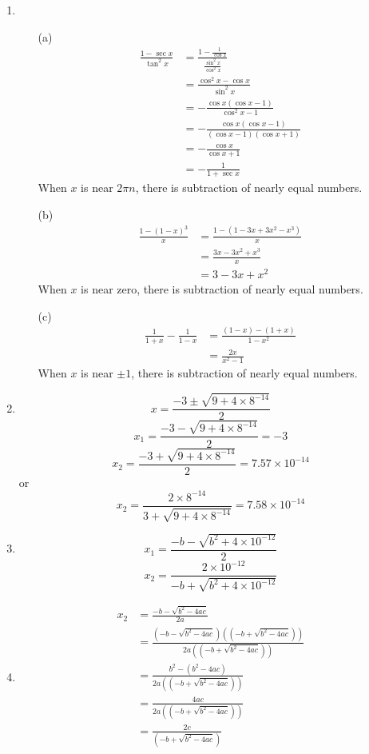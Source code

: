 \documentclass[UTF8]{ctexart}
\begin{document}
\begin{enumerate}
\item \begin{itemize}
\item[(a)] 
\begin{align*}
\frac{1 - \sec x}{\tan^2x} &= \frac{1 - \frac{1}{\cos x}}{\frac{\sin^2 x}{\cos^2 x}} \\
&= \frac{\cos^2 x - \cos x}{\sin^2 x} \\
&= -\frac{\cos x(\cos x - 1)}{\cos^2 x - 1} \\
&= -\frac{\cos x(\cos x - 1)}{(\cos x - 1)(\cos x + 1)} \\
&= -\frac{\cos x}{\cos x + 1} \\
&= -\frac{1}{1 + \sec x}
\end{align*}
When $x$ is near $2\pi n$, there is subtraction of nearly equal numbers.

\item[(b)] 
\begin{align*}
\frac{1 - (1-x)^3}{x} &= \frac{1 - (1 - 3x + 3x^2 - x^3)}{x} \\
&= \frac{3x - 3x^2 + x^3}{x} \\
&= 3 - 3x + x^2
\end{align*}
When $x$ is near zero, there is subtraction of nearly equal numbers.

\item[(c)]
\begin{align*}
\frac{1}{1 + x} - \frac{1}{1 - x} &= \frac{(1 - x) - (1 + x)}{1 - x^2} \\
&= \frac{2x}{x^2 - 1}
\end{align*}
When $x$ is near $\pm1$, there is subtraction of nearly equal numbers.

\end{itemize}

\item 
\[
	x = \frac{-3 \pm \sqrt{9 + 4\times8^{-14}}}{2}
\]
\[
	x_1 = \frac{-3 - \sqrt{9 + 4\times8^{-14}}}{2} = -3
\]
\[
	x_2 = \frac{-3 + \sqrt{9 + 4\times8^{-14}}}{2} = 7.57 \times 10^{-14}
\]
or
\[
	x_2 = \frac{2 \times 8^{-14}}{3 + \sqrt{9 + 4\times8^{-14}}} = 7.58 \times 10^{-14}
\]

\item 
\[
	x_1 = \frac{-b - \sqrt{b^2 + 4 \times 10^{-12}}}{2}
\]
\[
	x_2 = \frac{2 \times 10^{-12}}{-b + \sqrt{b^2 + 4 \times 10^{-12}}}
\]

\item 
\begin{align*}
x_2 &= \frac{-b - \sqrt{b^2 - 4ac}}{2a} \\
&= \frac{(-b - \sqrt{b^2 - 4ac})((-b + \sqrt{b^2 - 4ac}))}{2a((-b + \sqrt{b^2 - 4ac}))} \\
&= \frac{b^2 - (b^2 - 4ac)}{2a((-b + \sqrt{b^2 - 4ac}))} \\
&= \frac{4ac}{2a((-b + \sqrt{b^2 - 4ac}))} \\
&= \frac{2c}{(-b + \sqrt{b^2 - 4ac})} \\
\end{align*}

\end{enumerate}
\end{document}
